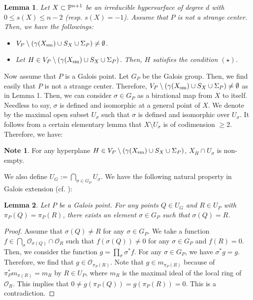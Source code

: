 \documentclass[10pt,oneside]{amsart}
\newtheorem{lemma}{Lemma}
\theoremstyle{definition}
\newtheorem{note}{Note}
\begin{document}
\begin{lemma}
Let $X \subset \Bbb P^{n+1}$ be an irreducible hypersurface of degree $d$ with $0 \le s(X) \le n-2$ (resp. $s(X)=-1$). 
Assume that $P$ is not a strange center. 
Then, we have the followings: 
\begin{itemize}
\item[(i)] $V_P \setminus (\gamma(X_{\rm sm}) \cup S_X \cup \Sigma_P) \ne \emptyset$. 
\item[(ii)] Let $H \in V_P \setminus (\gamma(X_{\rm sm}) \cup S_X \cup \Sigma_P)$.  
Then, $H$ satisfies the condition $(\star)$.  
\end{itemize} 
\end{lemma}

Now assume that $P$ is a Galois point.  
Let $G_P$ be the Galois group. 
Then, we find easily that $P$ is not a strange center. 
Therefore, $V_P \setminus (\gamma(X_{\rm sm}) \cup S_X \cup \Sigma_P) \ne \emptyset$ as in Lemma 1. 
Then, we can consider $\sigma \in G_P$ as a birational map from $X$ to itself. 
Needless to say, $\sigma$ is defined and isomorphic at a general point of $X$. 
We denote by the maximal open subset $U_{\sigma}$ such that $\sigma$ is defined and isomorphic over $U_{\sigma}$.
It follows from a certain elementary lemma \cite[V. Lemma 5.1]{hartshorne} that $X \setminus U_{\sigma}$ is of codimension $\ge 2$. 
Therefore, we have: 

\begin{note} 
For any hyperplane $H \in V_P \setminus (\gamma(X_{\rm sm}) \cup S_X \cup \Sigma_P)$, $X_H \cap U_{\sigma}$ is non-empty. 
\end{note} 

We also define $U_G:=\bigcap_{\sigma \in G_P} U_{\sigma}$. 
We have the following natural property in Galois extension (cf. \cite[III. 7.1]{stichtenoth}):

\begin{lemma} 
Let $P$ be a Galois point. 
For any points $Q \in U_G$ and $R \in U_P$ with $\pi_P(Q)=\pi_P(R)$, there exists an element $\sigma \in G_P$ such that $\sigma(Q)=R$. 
\end{lemma} 

\begin{proof}
Assume that $\sigma(Q) \ne R$ for any $\sigma \in G_P$. 
We take a function $f \in \bigcap_{\sigma} \mathcal{O}_{\sigma(Q)} \cap \mathcal{O}_R$ such that $f(\sigma(Q)) \ne 0$ for any $\sigma \in G_P$ and $f(R)=0$. 
Then, we consider the function $g=\prod_{\sigma} \sigma^{*}f$. 
For any $\sigma \in G_P$, we have $\sigma^{*}g=g$. 
Therefore, we find that $g \in \mathcal{O}_{\pi_P(R)}$. 
Note that $g \in m_{\pi_P(R)}$ because of $\pi_P^*m_{\pi(R)}=m_R$ by $R \in U_P$, where $m_R$ is the maximal ideal of the local ring of $\mathcal{O}_R$.  
This implies that $0 \ne g(\pi_P(Q))=g(\pi_P(R))= 0$. 
This is a contradiction. 
\end{proof}
\end{document}
